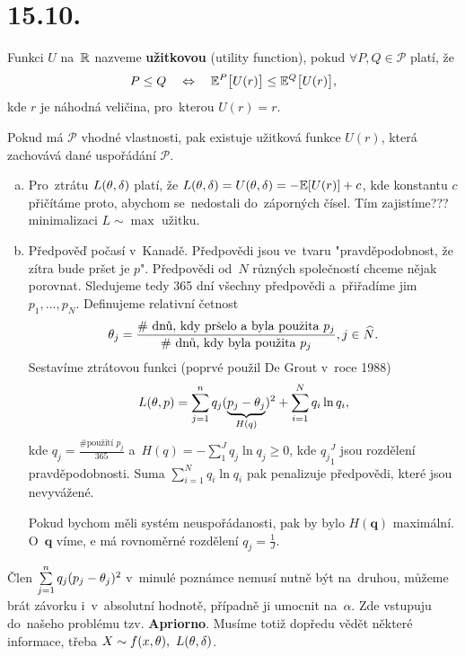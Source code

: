 \section{15.10.}
\begin{define}
	Funkci $U$ na~$\mathbb{R}$ nazveme \textbf{užitkovou} (utility function), pokud $\forall P,Q\in\mathcal{P}$ platí, že 
	$$ P\leq Q\quad\Leftrightarrow\quad\mathbb{E}^P\big[U(r)\big]\leq\mathbb{E}^Q\big[U(r)\big],$$ kde $r$ je náhodná veličina, pro~kterou $U(r)=r$.
\end{define}
\begin{remark}
	Pokud má $\mathcal{P}$ vhodné vlastnosti, pak existuje užitková funkce $U(r)$, která zachovává dané uspořádání $\mathcal{P}$. 
\end{remark}
\begin{remark}
	\begin{enumerate}[a)]
		\item Pro~ztrátu $L(\theta,\delta)$ platí, že $L(\theta,\delta)=U(\theta,\delta)=-\mathbb{E}[U(r)]+c$, kde konstantu $c$ přičítáme proto, abychom se~nedostali do~záporných čísel. Tím zajistíme??? minimalizaci $L\sim\max$ užitku.
		\item Předpověď počasí v~Kanadě. Předpovědi jsou ve~tvaru "pravděpodobnost, že zítra bude pršet je $p$". Předpovědi od~$N$ různých společností chceme nějak porovnat. Sledujeme tedy 365 dní všechny předpovědi a~přiřadíme jim $p_1,...,p_N$. Definujeme relativní četnost $$\theta_j=\frac{\text{\# dnů, kdy pršelo a~byla použita }p_j}{\text{\# dnů, kdy byla použita }p_j},j\in\widehat{N}.$$ Sestavíme ztrátovou funkci (poprvé použil De Grout v~roce 1988) $$L(\theta,p)=\sum\limits_{j=1}^{n} q_j(\underbrace{p_j-\theta_j}_{H(q)})^2+\sum_{i=1}^N q_i\ln q_i,$$ kde $q_j=\frac{\text{\# použití }p_j}{365}$ a~$H(q)=-\sum_1^J q_j\ln q_j\geq 0$, kde ${q_j}_1^J$ jsou rozdělení pravděpodobnosti. Suma $\sum_{i=1}^N q_i\ln q_i$ pak penalizuje předpovědi, které jsou nevyvážené.
		
		Pokud bychom měli systém neuspořádanosti, pak by bylo $H(\textbf{q})$ maximální. O~$\textbf{q}$ víme, e má rovnoměrné rozdělení $q_j=\frac{1}{J}$.
	\end{enumerate}
\end{remark}
\begin{remark}
	Člen $\sum\limits_{j=1}^{n} q_j(p_j-\theta_j)^2$ v~minulé poznámce nemusí nutně být na~druhou, můžeme brát závorku i~v~absolutní hodnotě, případně ji umocnit na~$\alpha$. Zde vstupuju do~našeho problému tzv. \textbf{Apriorno}. Musíme totiž dopředu vědět některé informace, třeba $X\sim f(x,\theta),~L(\theta,\delta)$.
\end{remark}

